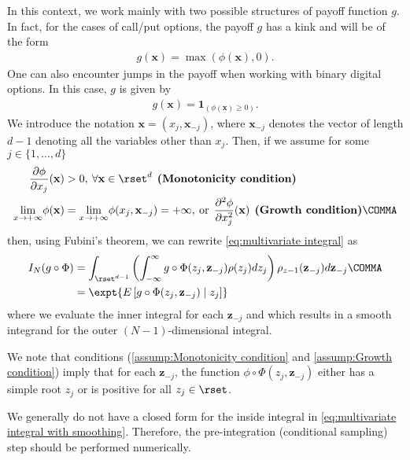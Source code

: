 In this context, we work mainly with two possible structures of payoff function $g$. In fact, for the cases of call/put options, the payoff $g$ has a kink and  will be of the form 
\begin{align*}
g(\mathbf{x})=\max(\phi(\mathbf{x}),0).
\end{align*}
One can also encounter jumps in the payoff when working with binary digital options. In this case, $g$ is given by 
\begin{align*}
	g(\mathbf{x})=\mathbf{1}_{(\phi(\mathbf{x}) \ge 0)}.
\end{align*}
We introduce the notation $\mathbf{x}=(x_j,\mathbf{x}_{-j})$, where $\mathbf{x}_{-j}$ denotes the vector of length $d-1$ denoting all the variables other than $x_j$. Then, if we assume for some $j \in \{1,\dots,d\}$
\begin{align}
	\frac{\partial \phi}{\partial x_j}(\mathbf{x}) &>0,\: \forall \mathbf{x} \in \rset^d \: \: \textbf{(Monotonicity condition)}  \label{assump:Monotonicity condition}\\
	\underset{x \rightarrow +\infty}{\lim} \phi(\mathbf{x})&=\underset{x \rightarrow +\infty}{\lim} \phi(x_j,\mathbf{x}_{-j})=+\infty, \: \text{or} \:\: \frac{\partial^2 \phi} {\partial x_j^2}(\mathbf{x}) \: \: \textbf{(Growth condition)}  \label{assump:Growth condition} \COMMA
\end{align}
then, using Fubini's theorem,  we can rewrite \eqref{eq:multivariate integral} as
\begin{align}\label{eq:multivariate integral with smoothing}
I_N (g \circ \Phi) &= \int_{\rset^{d-1}} \left(\int_{-\infty}^\infty g \circ\Phi(z_j,\mathbf{z}_{-j}) \rho(z_j) dz_j  \right) \rho_{z-1}(\mathbf{z}_{-j}) d\mathbf{z}_{-j}\COMMA \\ \nonumber	  
&= \expt{E \left[g \circ\Phi(z_j,\mathbf{z}_{-j}) \mid z_j \right]}
\end{align}
where we evaluate the inner integral for each $\mathbf{z}_{-j}$ and which results in a smooth integrand for the outer $(N-1)$-dimensional integral. 

We note that  conditions (\eqref{assump:Monotonicity condition} and \eqref{assump:Growth condition}) imply that for each $\mathbf{z}_{-j}$, the function $\phi \circ \Phi(z_j,\mathbf{z}_{-j})$ either has a simple  root $z_j$ or is positive for all $z_j \in \rset$.

We generally do not have a closed form for the inside integral in \eqref{eq:multivariate integral with smoothing}. Therefore, the pre-integration (conditional sampling)  step should be performed numerically.